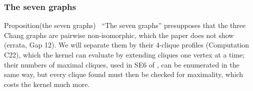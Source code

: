 \subsubsection*{The seven graphs}

\begin{namedresult}{Proposition}{(the seven graphs)}\label{prop:414-seven}
 \repair\ ``The seven graphs'' presupposes that the three Chang graphs are pairwise
 non-isomorphic, which the paper does not show (errata, Gap 12). We will separate them by their
 4-clique profiles (Computation C22), which the kernel can evaluate by extending cliques one
 vertex at a time; their numbers of maximal cliques, used in SE6 of
 , can be enumerated in the same way, but every clique found must
 then be checked for maximality, which costs the kernel much more.
\end{namedresult}
